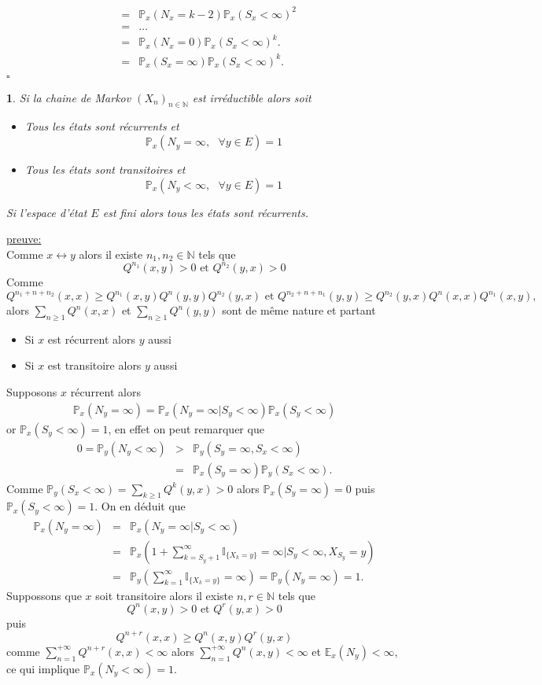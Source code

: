 \documentclass[8pt,notheorems]{beamer}
\def \E{\mathbb E}
\def \N{\mathbb N}
\def \P {\mathbb P}
\newtheorem{corollary}{\translate{Corollaire}}
\theoremstyle{definition}
\theoremstyle{example}
\theoremstyle{mystyle}
\theoremstyle{plain}
\begin{document}
\begin{frame}[allowframebreaks]
\begin{eqnarray*}
&=&\mathbb{P}_x(N_x=k-2)\mathbb{P}_x(S_x<\infty)^{2}\\
&=&\ldots\\
&=&\mathbb{P}_x(N_x=0)\mathbb{P}_x(S_x<\infty)^{k}.\\
&=&\mathbb{P}_x(S_x=\infty)\mathbb{P}_x(S_x<\infty)^{k}.\\
\end{eqnarray*}
$\square$
\begin{corollary}
Si la chaine de Markov $(X_n)_{n\in\N}$ est irréductible alors soit
\begin{itemize}
\item Tous les états sont récurrents et
$$
\P_x(N_y = \infty, \text{ }\forall y\in E)=1
$$
\item Tous les états sont transitoires et
$$
\P_x(N_y < \infty, \text{ }\forall y\in E)=1
$$
\end{itemize}
Si l'espace d'état $E$ est fini alors tous les états sont récurrents.
\end{corollary}
\underline{preuve:}\\
Comme $x\leftrightarrow y$ alors il existe $n_1, n_2\in\N$ tels que
$$
Q^{n_1}(x,y)>0\text{ et }Q^{n_2}(y,x)>0
$$
Comme
$$
Q^{n_1+n + n_2}(x,x)\geq Q^{n_1}(x,y)Q^{n}(y,y)Q^{n_2}(y,x)\text{ et }Q^{n_2+n + n_1}(y,y)\geq Q^{n_2}(y,x)Q^{n}(x,x)Q^{n_1}(x,y),
$$
alors $\sum_{n\geq 1}Q^{n}(x,x)$ et $\sum_{n\geq 1}Q^{n}(y,y)$ sont de même nature et partant
\begin{itemize}
\item Si $x$ est récurrent alors $y$ aussi
\item Si $x$ est transitoire alors $y$ aussi
\end{itemize}
Supposons $x$ récurrent alors
\begin{eqnarray*}
\P_x(N_y =\infty)=\P_x(N_y =\infty| S_y<\infty)\P_x(S_y<\infty)
\end{eqnarray*}
or $\P_x(S_y<\infty)=1$, en effet on peut remarquer que
\begin{eqnarray*}
0 = \P_y(N_y<\infty)&>&\P_y(S_y = \infty, S_x < \infty)\\
&=&\P_x(S_y = \infty)\P_y(S_x < \infty).
\end{eqnarray*}
Comme $\P_y(S_x < \infty) = \sum_{k\geq1}Q^k(y,x)>0$ alors $\P_x(S_y = \infty)=0$ puis $\P_x(S_y < \infty) = 1$. On en déduit que
\begin{eqnarray*}
\P_x(N_y =\infty)&=&\P_x(N_y =\infty| S_y<\infty)\\
&=&\P_x(1+\sum_{k = S_y+1}^{\infty}\mathbb{I}_{\{X_k = y\}} = \infty| S_y<\infty, X_{S_y} = y)\\
&=&\P_y\left(\sum_{k = 1}^{\infty}\mathbb{I}_{\{X_k = y\}} = \infty\right) =\P_y\left(N_y= \infty\right)  = 1.
\end{eqnarray*}
Suppossons que $x$ soit transitoire alors il existe $n,r\in \N$ tels que
$$
Q^{n}(x,y)>0\text{ et } Q^{r}(y,x)>0
$$
puis
$$
Q^{n+r}(x,x)\geq Q^{n}(x,y)Q^{r}(y,x)
$$
comme $\sum_{n = 1}^{+\infty} Q^{n+r}(x,x) <\infty$ alors $\sum_{n = 1}^{+\infty} Q^{n}(x,y) <\infty$ et $\E_x(N_y) <\infty$, ce qui implique $\P_x(N_y <\infty)=1$.\\


\end{frame}
\end{document}
